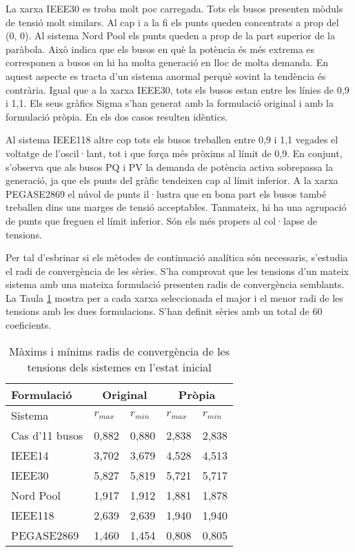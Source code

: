 La xarxa IEEE30 es troba molt poc carregada. Tots els busos presenten mòduls de tensió molt similars. Al cap i a la fi els punts queden concentrats a prop del (0, 0). Al sistema Nord Pool els punts queden a prop de la part superior de la paràbola. Això indica que els busos en què la potència és més extrema es corresponen a busos on hi ha molta generació en lloc de molta demanda. En aquest aspecte es tracta d'un sistema anormal perquè sovint la tendència és contrària. Igual que a la xarxa IEEE30, tots els busos estan entre les línies de 0,9 i 1,1. Els seus gràfics Sigma s'han generat amb la formulació original i amb la formulació pròpia. En els dos casos resulten idèntics.

Al sistema IEEE118 altre cop tots els busos treballen entre 0,9 i 1,1 vegades el voltatge de l'oscil·lant, tot i que força més pròxims al límit de 0,9. En conjunt, s'observa que als busos PQ i PV la demanda de potència activa sobrepassa la generació, ja que els punts del gràfic tendeixen cap al límit inferior. A la xarxa PEGASE2869 el núvol de punts il·lustra que en bona part els busos també treballen dins uns marges de tensió acceptables. Tanmateix, hi ha una agrupació de punts que freguen el límit inferior. Són els més propers al col·lapse de tensions. 

Per tal d'esbrinar si els mètodes de continuació analítica són necessaris, s'estudia el radi de convergència de les sèries. S'ha comprovat que les tensions d'un mateix sistema amb una mateixa formulació presenten radis de convergència semblants. La Taula \ref{tab:radis_sist} mostra per a cada xarxa seleccionada el major i el menor radi de les tensions amb les dues formulacions. S'han definit sèries amb un total de 60 coeficients.

\begin{table}[!htb]
  \begin{center}
  \begin{tabular}{lllll}
  \hline
   Formulació & \multicolumn{2}{c}{Original} & \multicolumn{2}{c}{Pròpia} \\
   \hline
  Sistema & $r_{max}$ & $r_{min}$ & $r_{max}$ & $r_{min}$\\
  \hline
  \hline
  Cas d'11 busos & 0,882 & 0,880 & 2,838 & 2,838 \\
  IEEE14 & 3,702 & 3,679 & 4,528 & 4,513\\
  IEEE30 & 5,827 & 5,819 & 5,721 & 5,717\\
  Nord Pool & 1,917 & 1,912 & 1,881 & 1,878\\
  IEEE118 & 2,639 & 2,639 & 1,940 & 1,940\\
  PEGASE2869 & 1,460 & 1,454 & 0,808 & 0,805\\
  \hline 
  \end{tabular}
  \caption{Màxims i mínims radis de convergència de les tensions dels sistemes en l'estat inicial}
  \label{tab:radis_sist}
  \end{center}
\end{table}

